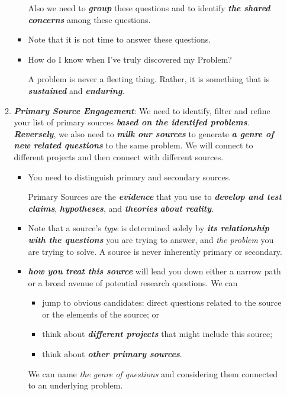 \documentclass[11pt]{article}
\begin{document}
\begin{itemize}
\begin{enumerate}
\begin{itemize}
Also we need to \emph{\textbf{group}} these questions and to identify \emph{\textbf{the shared concerns}} among these questions.

\item Note that it is not time to answer these questions. 

\item How do I know when I’ve truly discovered my Problem? 

A problem is never a fleeting thing. Rather, it is something that is \emph{\textbf{sustained}} and \emph{\textbf{enduring}}.
\end{itemize}

\item \emph{\textbf{Primary Source Engagement}}: We need to identify, filter and refine your list of primary sources \emph{\textbf{based on the identifed problems}}. \emph{\textbf{Reversely}}, we also need to \emph{\textbf{milk our sources}} to generate \emph{\textbf{a genre of new related questions}} to the same problem. We will connect to different projects and then connect with different sources.
\begin{itemize}
\item You need to distinguish primary and secondary sources.

Primary Sources are the \emph{\textbf{evidence}} that you use to \emph{\textbf{develop and test claims}}, \emph{\textbf{hypotheses}}, and \emph{\textbf{theories} \textbf{about reality}}. 

\item Note that a source’s \emph{type} is determined solely by \emph{\textbf{its relationship with the questions}} you are trying to answer, and \emph{the problem} you are trying to solve. A source is never inherently primary or secondary.

\item \emph{\textbf{how you treat this source}} will lead you down either a narrow path or a broad avenue of potential research questions. We can
\begin{itemize}
\item jump to obvious candidates: direct questions related to the source or the elements of the source; or
\item think about \emph{\textbf{different projects}} that might include this source;
\item think about \emph{\textbf{other primary sources}}.
\end{itemize} We can name \emph{the genre of questions} and considering them connected to an underlying problem. 


\end{itemize}
\end{enumerate}
\end{itemize}
\end{document}
